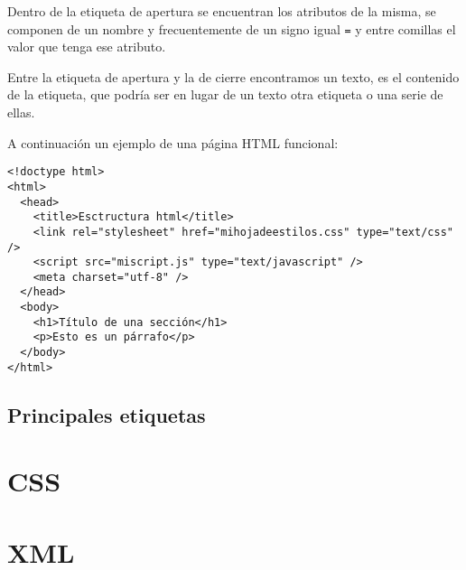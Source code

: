 \documentclass[11pt]{article}
\begin{document}
Dentro de la etiqueta de apertura se encuentran los atributos de la misma, se componen de un nombre y frecuentemente de un signo igual \texttt{=} y entre comillas el valor que tenga ese atributo.

Entre la etiqueta de apertura y la de cierre encontramos un texto, es el contenido de la etiqueta, que podría ser en lugar de un texto otra etiqueta o una serie de ellas.

A continuación un ejemplo de una página HTML funcional:
\begin{verbatim}
<!doctype html>
<html>
  <head>
    <title>Esctructura html</title>
    <link rel="stylesheet" href="mihojadeestilos.css" type="text/css" />
    <script src="miscript.js" type="text/javascript" />
    <meta charset="utf-8" />
  </head>
  <body>
    <h1>Título de una sección</h1>
    <p>Esto es un párrafo</p>
  </body>
</html>
\end{verbatim}

\subsection{Principales etiquetas}
\label{sec:org4df5000}

\section{CSS}
\label{sec:org51c1a1b}
\section{XML}
\label{sec:orgd092555}
\end{document}
